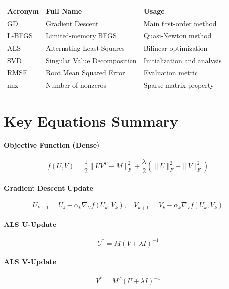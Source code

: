 \documentclass[11pt,oneside]{article}
\newcommand{\grad}{\nabla}
\begin{document}
\begin{tabularx}{\textwidth}{llX}
\toprule
\textbf{Acronym} & \textbf{Full Name} & \textbf{Usage} \\
\midrule
GD & Gradient Descent & Main first-order method \\
L-BFGS & Limited-memory BFGS & Quasi-Newton method \\
ALS & Alternating Least Squares & Bilinear optimization \\
SVD & Singular Value Decomposition & Initialization and analysis \\
RMSE & Root Mean Squared Error & Evaluation metric \\
nnz & Number of nonzeros & Sparse matrix property \\
\bottomrule
\end{tabularx}

\section{Key Equations Summary}\label{app:equations}

\paragraph{Objective Function (Dense)}
\begin{equation*}
    f(U, V) = \frac{1}{2}\|UV^T - M\|_F^2 + \frac{\lambda}{2}(\|U\|_F^2 + \|V\|_F^2)
\end{equation*}

\paragraph{Gradient Descent Update}
\begin{equation*}
    U_{k+1} = U_k - \alpha_k \grad_U f(U_k, V_k), \quad V_{k+1} = V_k - \alpha_k \grad_V f(U_k, V_k)
\end{equation*}

\paragraph{ALS U-Update}
\begin{equation*}
    U^* = M(V + \lambda I)^{-1}
\end{equation*}

\paragraph{ALS V-Update}
\begin{equation*}
    V^* = M^T(U + \lambda I)^{-1}
\end{equation*}
\end{document}
